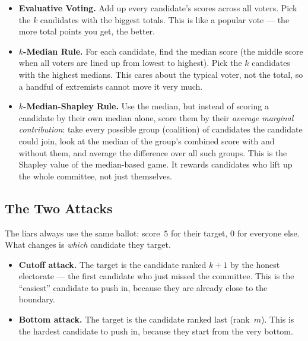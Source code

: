 \documentclass[11pt,a4paper]{article}
\begin{document}
\begin{itemize}
  \item \textbf{Evaluative Voting.}
        Add up every candidate's scores across all voters. Pick the \(k\)
        candidates with the biggest totals. This is like a popular vote ---
        the more total points you get, the better.
  \item \textbf{\(k\)-Median Rule.}
        For each candidate, find the median score (the middle score when all
        voters are lined up from lowest to highest). Pick the \(k\) candidates
        with the highest medians. This cares about the typical voter, not the
        total, so a handful of extremists cannot move it very much.
  \item \textbf{\(k\)-Median-Shapley Rule.}
        Use the median, but instead of scoring a candidate by their own
        median alone, score them by their \emph{average marginal
        contribution}: take every possible group (coalition) of candidates
        the candidate could join, look at the median of the group's combined
        score with and without them, and average the difference over all
        such groups. This is the Shapley value of the median-based game. It
        rewards candidates who lift up the whole committee, not just
        themselves.
\end{itemize}

\subsection{The Two Attacks}

The liars always use the same ballot: score~\(5\) for their target, \(0\) for
everyone else. What changes is \emph{which} candidate they target.

\begin{itemize}
  \item \textbf{Cutoff attack.} The target is the candidate ranked \(k+1\)
        by the honest electorate --- the first candidate who just missed the
        committee. This is the ``easiest'' candidate to push in, because they
        are already close to the boundary.
  \item \textbf{Bottom attack.} The target is the candidate ranked last
        (rank~\(m\)). This is the hardest candidate to push in, because they
        start from the very bottom.
\end{itemize}
\end{document}
